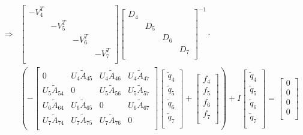 \begin{align*}
    \Rightarrow
    &\begin{bmatrix}
        -V^T_4    & & & \\
        & -V^T_5    & & \\
        & & -V^T_6    & \\
        & & & -V^T_7    \\
    \end{bmatrix}
    \begin{bmatrix}
        D_4    & & & \\
        & D_5    & & \\
        & & D_6    & \\
        & & & D_7    \\
    \end{bmatrix}^{-1} \cdot
    \\
    &\left(
    -
    \begin{bmatrix}
    0    & U_4\widetilde{A}_{45} & U_4\widetilde{A}_{46} & U_4\widetilde{A}_{47} \\
    U_5\widetilde{A}_{54} & 0 & U_5\widetilde{A}_{56} & U_5\widetilde{A}_{57} \\
    U_6\widetilde{A}_{64} & U_6\widetilde{A}_{65} & 0 & U_6\widetilde{A}_{67} \\
    U_7\widetilde{A}_{74} & U_7\widetilde{A}_{75} & U_7\widetilde{A}_{76} &    0 \\
\end{bmatrix}
\begin{bmatrix}
    \widetilde{q}_4 \\
    \widetilde{q}_5 \\
    \widetilde{q}_6 \\
    \widetilde{q}_7 \\
\end{bmatrix}
+
\begin{bmatrix}
    f_4 \\
    f_5 \\
    f_6 \\
    f_7 \\
\end{bmatrix}
    \right)
    + I
\begin{bmatrix}
    \widetilde{q}_4 \\
    \widetilde{q}_5 \\
    \widetilde{q}_6 \\
    \widetilde{q}_7 \\
\end{bmatrix}
=
\begin{bmatrix}
    0 \\
    0 \\
    0 \\
    0 \\
\end{bmatrix}
\end{align*}
